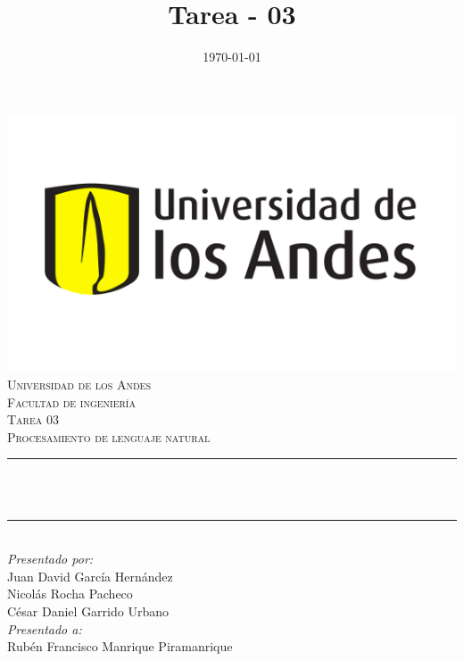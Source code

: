 \documentclass[12pt]{article}
\title{Tarea - 03}
\date{\today}
\makeatletter
\let\thetitle\@title
\makeatother
\begin{document}
    \pagestyle{fancy}
    \fancyhf{}

    \renewcommand{\headrulewidth}{0.7pt}
\fancyfoot[R]{\thepage}

\begin{titlepage}
	\centering
    \includegraphics[scale = 0.45]{images/Logo.png}\\[0.5 cm]	%
    \textsc{\large Universidad de los Andes\\
        \vspace{0.2cm} 
        Facultad de ingeniería\\
        \vspace{0.3cm} 
        Tarea 03}\\[2.0 cm]	%
	\textsc{\Large Procesamiento de lenguaje natural}\\[0.5 cm]
	\rule{\linewidth}{0.2 mm} \\[0.4 cm]
	{ \LARGE \bfseries \thetitle}\\
	\rule{\linewidth}{0.2 mm} \\[1.5 cm]
	
	\large
			\emph{Presentado por:} \\
			Juan David García Hernández\\
			Nicolás Rocha Pacheco\\
			César Daniel Garrido Urbano\\
	\vfill
	\large
			\emph{Presentado a:}\\
			Rubén Francisco Manrique Piramanrique\\
\end{titlepage}

\thispagestyle{empty}
\tableofcontents
\pagebreak

\setcounter{page}{1}








\newpage


\end{document}
